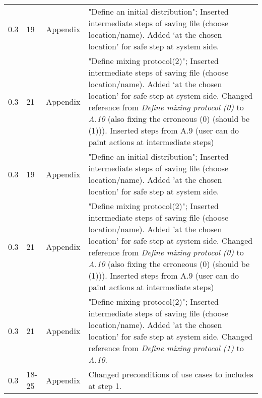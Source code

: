 \begin{longtable}{|l|l|l|p{11cm}|}
    0.3 & 19 & Appendix & "Define an initial distribution"; Inserted intermediate steps of saving file (choose location/name). Added `at the chosen location' for safe step at system side.\\
    0.3 & 21 & Appendix & "Define mixing protocol(2)"; Inserted intermediate steps of saving file (choose location/name). Added `at the chosen location' for safe step at system side. Changed reference from \emph{Define mixing protocol (0)} to \emph{A.10} (also fixing the erroneous (0) (should be (1))). Inserted steps from A.9 (user can do paint actions at intermediate steps) \\
    0.3 & 19 & Appendix & "Define an initial distribution"; Inserted intermediate steps of saving file (choose location/name). Added 'at the chosen location' for safe step at system side.\\
    0.3 & 21 & Appendix & "Define mixing protocol(2)"; Inserted intermediate steps of saving file (choose location/name). Added 'at the chosen location' for safe step at system side. Changed reference from \emph{Define mixing protocol (0)} to \emph{A.10} (also fixing the erroneous (0) (should be (1))). Inserted steps from A.9 (user can do paint actions at intermediate steps) \\
    0.3 & 21 & Appendix & "Define mixing protocol(2)"; Inserted intermediate steps of saving file (choose location/name). Added 'at the chosen location' for safe step at system side. Changed reference from \emph{Define mixing protocol (1)} to \emph{A.10}.\\
    0.3 & 18-25 & Appendix & Changed preconditions of use cases to includes at step 1.
\end{longtable}
